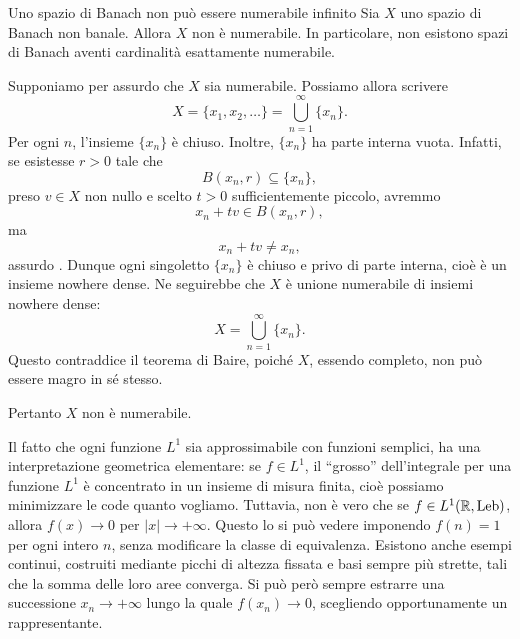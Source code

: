 \documentclass[a4paper]{article}
\begin{document}
\begin{radioactive}
\begin{snippetproposition}{Uno spazio di Banach non può essere numerabile infinito}
    Sia \(X\) uno spazio di Banach non banale. Allora \(X\) non è numerabile.
    In particolare, non esistono spazi di Banach aventi cardinalità
    esattamente numerabile.
\end{snippetproposition}
\end{radioactive}

\begin{radioactive}
\begin{snippetproof}{}
    Supponiamo per assurdo che \(X\) sia numerabile. Possiamo allora scrivere
    \[
        X=\{x_1,x_2,\ldots\}
        =
        \bigcup_{n=1}^{\infty}\{x_n\}.
    \]
    Per ogni \(n\), l'insieme \(\{x_n\}\) è chiuso.
    Inoltre, \(\{x_n\}\) ha parte interna vuota. Infatti, se esistesse
    \(r>0\) tale che
    \[
        B(x_n,r)\subseteq\{x_n\},
    \]
    preso \(v\in X\) non nullo e scelto \(t>0\) sufficientemente piccolo,
    avremmo
    \[
        x_n+tv\in B(x_n,r),
    \]
    ma
    \[
        x_n+tv\neq x_n,
    \]
    assurdo \lightning.
    Dunque ogni singoletto \(\{x_n\}\) è chiuso e privo di parte interna,
    cioè è un insieme nowhere dense. Ne seguirebbe che \(X\) è unione
    numerabile di insiemi nowhere dense:
    \[
        X=\bigcup_{n=1}^{\infty}\{x_n\}.
    \]
    Questo contraddice il teorema di Baire, poiché \(X\), essendo completo,
    non può essere magro in sé stesso.

    Pertanto \(X\) non è numerabile.
\end{snippetproof}
\end{radioactive}

\begin{radioactive}
Il fatto che ogni funzione \(L^1\)
sia approssimabile con funzioni semplici,
ha una interpretazione geometrica elementare:
se \(f\in L^1\), il ``grosso'' dell'integrale per una funzione \(L^1\) è concentrato
in un insieme di misura finita, cioè possiamo minimizzare le code quanto vogliamo.
Tuttavia, non è vero che se \(f \in L^1(\mathbb{R}, \mathrm{Leb})\), allora \(f(x)\to0\)
per \(|x|\to+\infty\).
Questo lo si può vedere imponendo \(f(n)=1\) per ogni intero \(n\), senza modificare la classe di equivalenza. Esistono anche esempi continui, costruiti mediante picchi di altezza fissata e basi sempre più strette, tali che la somma delle loro aree converga. Si può però sempre estrarre una successione \(x_n\to+\infty\) lungo la quale \(f(x_n)\to0\), scegliendo opportunamente un rappresentante.
\end{radioactive}
\end{document}
